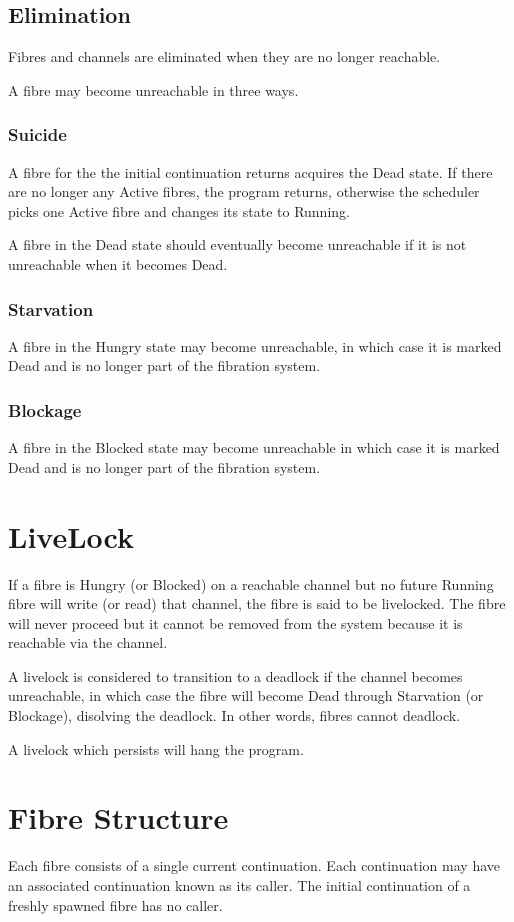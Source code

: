 \documentclass{article}
\begin{document}
\subsection{Elimination}
Fibres and channels are eliminated when they are 
no longer reachable.

A fibre may become unreachable in three ways.

\subsubsection{Suicide}
A fibre for the the initial continuation returns acquires
the Dead state. If there are no longer any Active fibres,
the program returns, otherwise the scheduler picks
one Active fibre and changes its state to Running.

A fibre in the Dead state should eventually become unreachable
if it is not unreachable when it becomes Dead.

\subsubsection{Starvation}
A fibre in the Hungry state may become unreachable,
in which case it is marked Dead and is no longer
part of the fibration system.

\subsubsection{Blockage}
A fibre in the Blocked state may become unreachable 
in which case it is marked Dead and is no longer
part of the fibration system.

\section{LiveLock}
If a fibre is Hungry (or Blocked) on a reachable channel
but no future Running fibre will write (or read) that
channel, the fibre is said to be livelocked. The fibre
will never proceed but it cannot be removed from
the system because it is reachable via the channel.

A livelock is considered to transition to a deadlock
if the channel becomes unreachable, in which case
the fibre will become Dead through Starvation (or Blockage),
disolving the deadlock. In other words, fibres cannot deadlock.

A livelock which persists will hang the program.


\section{Fibre Structure}
Each fibre consists of a single current continuation.
Each continuation may have an associated continuation
known as its caller. The initial continuation of a freshly
spawned fibre has no caller.
\end{document}
